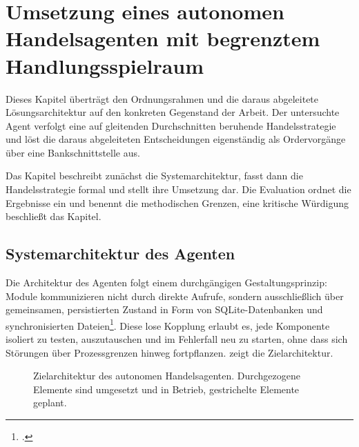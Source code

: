 %

\chapter{Umsetzung eines autonomen Handelsagenten mit begrenztem Handlungsspielraum}
\label{cha:umsetzung}

Dieses Kapitel überträgt den Ordnungsrahmen und die daraus abgeleitete Lösungsarchitektur
auf den konkreten Gegenstand der Arbeit. Der untersuchte Agent verfolgt eine auf gleitenden
Durchschnitten beruhende Handelsstrategie und löst die daraus abgeleiteten Entscheidungen
eigenständig als Ordervorgänge über eine Bankschnittstelle aus.

Das Kapitel beschreibt zunächst die Systemarchitektur, fasst dann die Handelsstrategie
formal und stellt ihre Umsetzung dar. Die Evaluation ordnet die Ergebnisse ein und benennt
die methodischen Grenzen, eine kritische Würdigung beschließt das Kapitel.

\section{Systemarchitektur des Agenten}
\label{sec:umsetzung-architektur}

Die Architektur des Agenten folgt einem durchgängigen Gestaltungsprinzip: Module
kommunizieren nicht durch direkte Aufrufe, sondern ausschließlich über gemeinsamen,
persistierten Zustand in Form von SQLite-Datenbanken und synchronisierten
Dateien\footcite[vgl.][]{sqliteWal}. Diese lose Kopplung erlaubt es, jede Komponente
isoliert zu testen, auszutauschen und im Fehlerfall neu zu starten, ohne dass sich Störungen
über Prozessgrenzen hinweg fortpflanzen.  zeigt die
Zielarchitektur.

\begin{figure}[!tb]
  \centering
  
  \caption[Zielarchitektur des autonomen Handelsagenten]{Zielarchitektur des
    autonomen Handelsagenten. Durchgezogene Elemente sind umgesetzt und in Betrieb,
    gestrichelte Elemente geplant.}
  \label{fig:zielarchitektur}
\end{figure}

